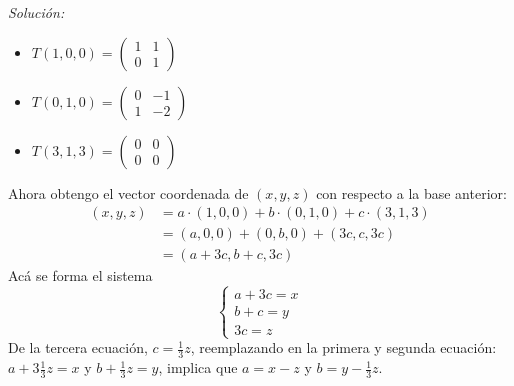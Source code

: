 \documentclass{article}
\newenvironment{solution}
    {\textit{Solución:}}
    {}
\begin{document}
\begin{solution}
\begin{itemize}
        \item 
        $T(1,0,0) = \begin{pmatrix} 1 & 1 \\ 0 & 1 \end{pmatrix}$
        \item 
        $T(0,1,0) = \begin{pmatrix} 0 & -1 \\ 1 & -2 \end{pmatrix}$
        \item 
        $T(3,1,3) = \begin{pmatrix} 0 & 0 \\ 0 & 0 \end{pmatrix}$
        \end{itemize}
        
        Ahora obtengo el vector coordenada de $(x,y,z)$ con respecto a la base anterior:
        \begin{align*}
        (x,y,z) &= a\cdot (1,0,0) + b\cdot (0,1,0) + c \cdot (3,1,3) \\
        &= (a,0,0) + (0,b,0) + (3c,c,3c) \\
        &= (a+3c, b+c, 3c)
        \end{align*}
        Acá se forma el sistema
        \[
        \begin{cases}
        a + 3c = x \\
        b+c = y \\
        3c = z
        \end{cases}
        \]
        De la tercera ecuación, $c = \frac{1}{3}z$, reemplazando en la primera y segunda ecuación: $a + 3\frac{1}{3}z = x$ y $b+\frac{1}{3}z = y$, implica que $a = x-z$ y $b= y-\frac{1}{3}z$.
        

\end{solution}
\end{document}
